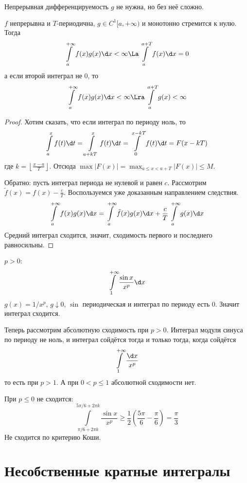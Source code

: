 \begin{Rem}
	Непрерывная дифференцируемость $g$ не нужна, но без неё сложно.
\end{Rem}

\begin{conseq}
	$f$ непрерывна и $T$-периодична, $g \in C^1[a, +\infty)$ и монотонно стремится к нулю.
	Тогда
	\[ \int\limits_a^{+\infty} f(x) g(x) \d x < \infty \La \int\limits_a^{a+T} f(x) \d x = 0 \]
	а если второй интеграл не 0, то
	\[ \int\limits_a^{+\infty} f(x) g(x) \d x < \infty \Lra \int\limits_a^{a+T} g(x) < \infty \]
\end{conseq}

\begin{proof}
	Хотим сказать, что если интеграл по периоду ноль, то
	\[ \int\limits_a^x f(t) \d t = \int\limits_{a+kT}^x f(t) \d t = \int\limits_0^{x-kT} f(t) \d t = F(x - kT) \]
	где $k = \left\lfloor \frac{x - a}T \right\rfloor$.
	Отсюда $\max |F(x)| = \max_{a \le x < a + T} |F(x)| \le M$.

	Обратно: пусть интеграл периода не нулевой и равен $c$.
	Рассмотрим $\tilde f(x) = f(x) - \frac{c}T$.
	Воспользуемся уже доказанным направлением следствия.
	\[ \int\limits_a^{+\infty} f(x) g(x) \d x = \int\limits_a^{+\infty} \tilde f(x) g(x) \d x + \frac{c}T \int\limits_a^{+\infty} g(x) \d x \]
	Средний интеграл сходится, значит, сходимость первого и последнего равносильны.
\end{proof}

\begin{exmp}
	$p > 0$:
	\[ \int\limits_1^{+\infty} \frac{\sin x}{x^p} \d x \]
	$g(x) = 1 / x^p$, $g \downarrow 0$, $\sin$ периодическая и интеграл по периоду есть 0.
	Значит интеграл сходится.

	Теперь рассмотрим абсолютную сходимость при $p>0$.
	Интеграл модуля синуса по периоду не ноль, и интеграл сойдётся тогда и только тогда, когда сойдётся
	\[ \int\limits_1^{+\infty} \frac{\d x}{x^p} \]
	то есть при $p > 1$.
	А при $0 < p \le 1$ абсолютной сходимости нет.

	При $p \le 0$ не сходится:
	\[ \int\limits_{\pi/6+2\pi k}^{5 \pi/6 + 2\pi k} \frac{\sin x}{x^p} \ge \frac12 \left(\frac{5\pi}6 - \frac\pi6\right) = \frac\pi3 \]
	Не сходится по критерию Коши.
\end{exmp}

\section{Несобственные кратные интегралы}

